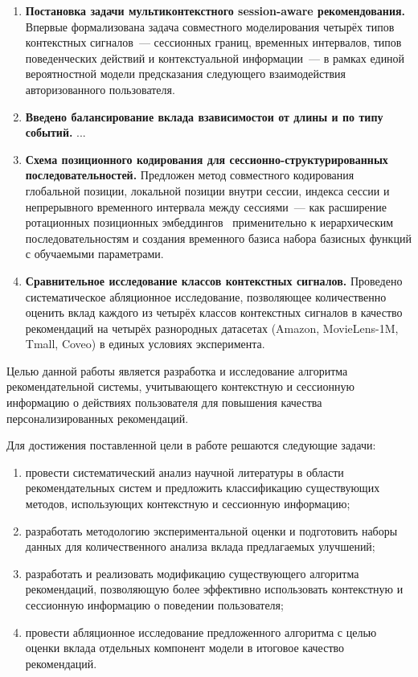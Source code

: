 \begin{enumerate}
    \item \textbf{Постановка задачи мультиконтекстного session-aware рекомендования.}
    Впервые формализована задача совместного моделирования четырёх типов контекстных сигналов~--- сессионных границ, временных интервалов, типов поведенческих действий и контекстуальной информации~--- в рамках единой вероятностной модели предсказания следующего взаимодействия авторизованного пользователя.
    \item \textbf{Введено балансирование вклада взависимостои от длины и по типу событий.}
    ...
    \item \textbf{Схема позиционного кодирования для сессионно-структурированных последовательностей.}
    Предложен метод совместного кодирования глобальной позиции, локальной позиции внутри сессии, индекса сессии и непрерывного временного интервала между сессиями~--- как расширение ротационных позиционных эмбеддингов~\cite{su2021roformer} применительно к иерархическим последовательностям и создания временного базиса набора базисных функций с обучаемыми параметрами.

    \item \textbf{Сравнительное исследование классов контекстных сигналов.}
    Проведено систематическое абляционное исследование, позволяющее количественно оценить вклад каждого из четырёх классов контекстных сигналов в качество рекомендаций на четырёх разнородных датасетах (Amazon, MovieLens-1M, Tmall, Coveo) в единых условиях эксперимента.
\end{enumerate}

Целью данной работы является разработка и исследование алгоритма рекомендательной системы, учитывающего контекстную и сессионную информацию о действиях пользователя для повышения качества персонализированных рекомендаций.

Для достижения поставленной цели в работе решаются следующие задачи:
\begin{enumerate}
    \item провести систематический анализ научной литературы в области рекомендательных систем и предложить классификацию существующих методов, использующих контекстную и сессионную информацию;
    \item разработать методологию экспериментальной оценки и подготовить наборы данных для количественного анализа вклада предлагаемых улучшений;
    \item разработать и реализовать модификацию существующего алгоритма рекомендаций, позволяющую более эффективно использовать контекстную и сессионную информацию о поведении пользователя;
    \item провести абляционное исследование предложенного алгоритма с целью оценки вклада отдельных компонент модели в итоговое качество рекомендаций.
\end{enumerate}


